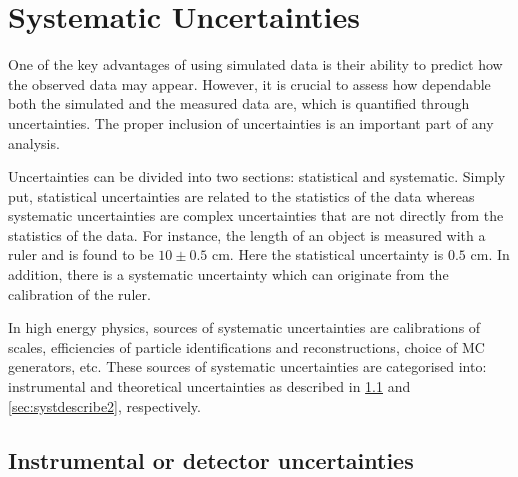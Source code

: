 \section{Systematic Uncertainties}
\label{sec:systinfo}
One of the key advantages of using simulated data is their ability to predict how the observed data may appear. 
However, it is crucial to assess how dependable both the simulated and the measured data are, which
is quantified through uncertainties. The proper inclusion of uncertainties is an important part of any analysis.

Uncertainties can be divided into two sections: statistical and systematic. Simply put, statistical uncertainties are
related to the statistics of the data whereas systematic uncertainties are complex uncertainties 
that are not directly from the statistics of the data. For instance, the length of an object is measured with a 
ruler and is found to be $10 \pm 0.5$ cm. Here the statistical uncertainty is $0.5$ cm. In addition,
there is a systematic uncertainty which can originate from the calibration of the ruler. 

In high energy physics, sources of systematic uncertainties are calibrations of scales, efficiencies of 
particle identifications and reconstructions, choice of MC generators, etc. These sources of systematic
uncertainties are categorised into: instrumental and theoretical uncertainties as described
in \cref{sec:systdescribe} and \cref{sec:systdescribe2}, respectively. 

\subsection{Instrumental or detector uncertainties}
\label{sec:systdescribe}

